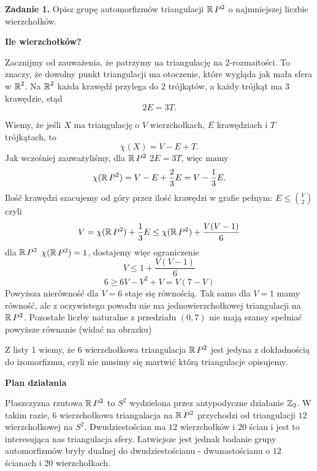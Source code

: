 \textbf{\large\color{orange}Zadanie 1.} Opisz grupę automorfizmów triangulacji $\operatorname{\mathbb{R}} P^2$ o najmniejszej liczbie wierzchołków.


\textbf{Ile wierzchołków?}

Zacznijmy od zauważenia, że patrzymy na triangulację na $2$-rozmaitości. To znaczy, że dowolny punkt triangulacji ma otoczenie, które wygląda jak mała sfera w $\operatorname{\mathbb{R}}^2$. Na $\operatorname{\mathbb{R}}^2$ każda krawędź przylega do $2$ trójkątów, a każdy trójkąt ma $3$ krawędzie, stąd
$$2E=3T.$$

Wiemy, że jeśli $X$ ma triangulację o $V$ wierzchołkach, $E$ krawędziach i $T$ trójkątach, to 
$$\chi(X)=V-E+T.$$
Jak wcześniej zauważyliśmy, dla $\operatorname{\mathbb{R}} P^2$ $2E=3T$, więc mamy
$$\chi(\operatorname{\mathbb{R}} P^2)=V-E+\frac{2}{3}E=V-\frac{1}{3}E.$$
Ilość krawędzi szacujemy od góry przez ilość krawędzi w grafie pełnym: $E\leq \binom{V}{2}$ czyli
$$V=\chi(\operatorname{\mathbb{R}} P^2)+\frac{1}{3}E\leq \chi(\operatorname{\mathbb{R}} P^2)+\frac{V(V-1)}{6}$$
dla $\operatorname{\mathbb{R}} P^2$ $\chi(\operatorname{\mathbb{R}} P^2)=1$, dostajemy więc ograniczenie
$$V\leq 1+\frac{V(V-1)}{6}$$
$$6\geq 6V-V^2+V=V(7-V)$$
Powyższa nierówność dla $V=6$ staje się równością. Tak samo dla $V=1$ mamy równość, ale z oczywistego powodu nie ma jednowierzchołkowej triangulacji na $\operatorname{\mathbb{R}} P^2$. Pozostałe liczby naturalne z przedziału $(0, 7)$ nie mają szansy spełniać powyższe równanie (widać na obrazku)
\begin{center}
\end{center}

Z listy 1 wiemy, że $6$ wierzchołkowa triangulacja $\operatorname{\mathbb{R}} P^2$ jest jedyna z dokładnością do izomorfizmu, czyli nie musimy się martwić którą triangulacje opisujemy.

\textbf{Plan działania}

Płaszczyzna rzutowa $\operatorname{\mathbb{R}} P^2$ to $S^2$ wydzielona przez antypodyczne działanie $\operatorname{\mathbb{Z}}_2$. W takim razie, $6$ wierzchołkowa triangulacja na $\operatorname{\mathbb{R}} P^2$ przychodzi od triangulacji $12$ wierzchołkowej na $S^2$. Dwudziestościan ma $12$ wierzchołków i $20$ ścian i jest to interesująca nas triangulacja sfery. Łatwiejsze jest jednak badanie grupy automorfizmów bryły dualnej do dwudziestościanu - dwunastościanu o $12$ ścianach i $20$ wierzchołkach.

